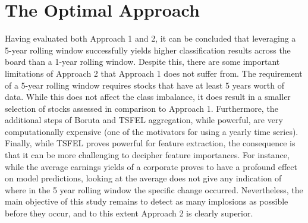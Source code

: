 \documentclass[a4paper]{report}
\begin{document}
\section{The Optimal Approach}
Having evaluated both Approach 1 and 2, it can be concluded that leveraging a 5-year rolling window successfully yields higher classification results across the board than a 1-year rolling window. Despite this, there are 
some important limitations of Approach 2 that Approach 1 does not suffer from. The requirement of a 5-year rolling window requires stocks that have at least 5 years worth of data. While this does not affect the class imbalance,
it does result in a smaller selection of stocks assessed in comparison to Approach 1. Furthermore, the additional steps of Boruta and TSFEL aggregation, while powerful, are very computationally expensive (one of the motivators
for using a yearly time series). Finally, while TSFEL proves powerful for feature extraction, the consequence is that it can be more challenging to decipher feature importances. For instance, while the average earnings yields 
of a corporate proves to have a profound effect on model predictions, looking at the average does not give any indication of where in the 5 year rolling window the specific change occurred. Nevertheless, the main objective of 
this study remains to detect as many implosions as possible before they occur, and to this extent Approach 2 is clearly superior.
\end{document}
